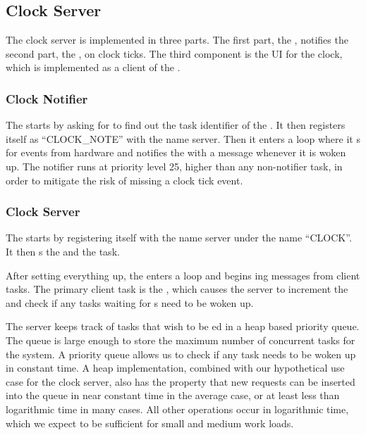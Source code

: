 \documentclass[pdftex,10pt,a4paper]{article}
\begin{document}
\subsection*{Clock Server}

The clock server is implemented in three parts. The first part, the
, notifies the second part, the
, on clock ticks. The third component is the UI for
the clock, which is implemented as a client of the
.

\subsubsection*{Clock Notifier}

The  starts by asking for  to
find out the task identifier of the . It then
registers itself as ``CLOCK\_NOTE'' with the name server.
Then it enters a  loop where it s for
 events from hardware and notifies the
 with a  message whenever it
is woken up. The notifier runs at priority level 25, higher than any
non-notifier task, in order to mitigate the risk of missing a clock
tick event.

\subsubsection*{Clock Server}

The  starts by registering itself with the name
server under the name ``CLOCK''. It then s the
 and the  task.

After setting everything up, the  enters a
 loop and begins ing messages from client
tasks. The primary client task is the , which
causes the server to increment the  and check if any tasks
waiting for s need to be woken up.

The server keeps track of tasks that wish to be ed in a
heap based priority queue. The queue is large enough to store the
maximum number of concurrent tasks for the system. A priority queue
allows us to check if any task needs to be woken up in constant
time. A heap implementation, combined with our hypothetical use case
for the clock server, also has the property that new 
requests can be inserted into the queue in near constant time in the
average case, or at least less than logarithmic time in many
cases. All other operations occur in logarithmic time, which we expect
to be sufficient for small and medium work loads.
\end{document}
